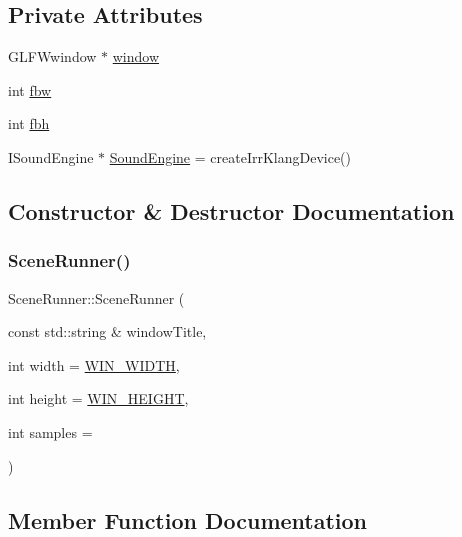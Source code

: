 \subsection*{Private Attributes}
\begin{DoxyCompactItemize}
\item 
G\+L\+F\+Wwindow $\ast$ \mbox{\hyperlink{class_scene_runner_a3b5f5327fe99c632c23b24e070956412}{window}}
\item 
int \mbox{\hyperlink{class_scene_runner_aa3be198f21a9fa47bbfe3c8e17f5550e}{fbw}}
\item 
int \mbox{\hyperlink{class_scene_runner_adce555fdcb0e5f9da11b29eac57454d9}{fbh}}
\item 
I\+Sound\+Engine $\ast$ \mbox{\hyperlink{class_scene_runner_a693a417260ec4a108552dc9e78c1a8d7}{Sound\+Engine}} = create\+Irr\+Klang\+Device()
\end{DoxyCompactItemize}


\subsection{Constructor \& Destructor Documentation}
\mbox{\label{class_scene_runner_adea055db042421bb84452dda5d404b61}} 
\subsubsection{\texorpdfstring{SceneRunner()}{SceneRunner()}}
{\footnotesize\ttfamily Scene\+Runner\+::\+Scene\+Runner (\begin{DoxyParamCaption}\item[{const std\+::string \&}]{window\+Title,  }\item[{int}]{width = {\ttfamily \mbox{\hyperlink{scenerunner_8h_a2e6ef411e0ff00ad889788b6cde701b5}{W\+I\+N\+\_\+\+W\+I\+D\+TH}}},  }\item[{int}]{height = {\ttfamily \mbox{\hyperlink{scenerunner_8h_a0a33b1743038db1adbbf1045aa839b38}{W\+I\+N\+\_\+\+H\+E\+I\+G\+HT}}},  }\item[{int}]{samples = {} }\end{DoxyParamCaption})\hspace{0.3cm}{\ttfamily [inline]}}



\subsection{Member Function Documentation}
\mbox{\label{class_scene_runner_aaf7581cf0e51977da02c58c088fd1cc2}} 
